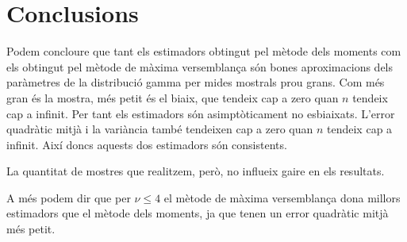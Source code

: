 \documentclass[12pt, catalan]{article}
\numberwithin{table}{section}
\numberwithin{figure}{section}
\numberwithin{equation}{section}
\begin{document}
\section{Conclusions}

Podem concloure que tant els estimadors obtingut pel mètode dels moments com els obtingut pel mètode de màxima versemblança són bones aproximacions dels paràmetres de la distribució gamma per mides mostrals prou grans. Com més gran és la mostra, més petit és el biaix, que tendeix cap a zero quan $n$ tendeix cap a infinit. Per tant els estimadors són asimptòticament no esbiaixats. L'error quadràtic mitjà i la variància també tendeixen cap a zero quan $n$ tendeix cap a infinit. Així doncs aquests dos estimadors són consistents.

La quantitat de mostres que realitzem, però, no influeix gaire en els resultats.

A més podem dir que per $\nu\leq4$ el mètode de màxima versemblança dona millors estimadors que el mètode dels moments, ja que tenen un error quadràtic mitjà més petit.
\newpage



\end{document}
